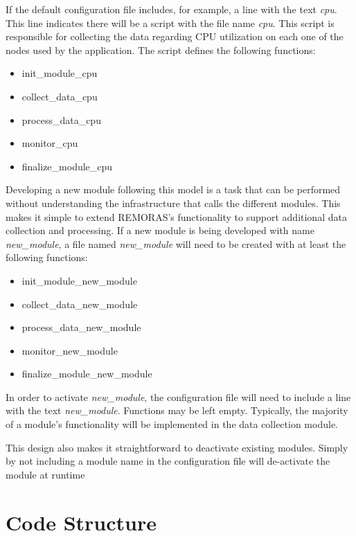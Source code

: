 \documentclass[10pt,a4paper]{report}
\begin{document}
If the default configuration file includes, for example, a line with the text \textit{cpu}.
This line indicates there will be a script with the file name \textit{cpu}. This script
is responsible for collecting the data regarding CPU utilization on each one of the
nodes used by the application. The script defines the following functions:

\begin{itemize}
	\item init\_module\_cpu
	\item collect\_data\_cpu
	\item process\_data\_cpu
	\item monitor\_cpu
	\item finalize\_module\_cpu
\end{itemize}

Developing a new module following this model is a task that can be performed without understanding 
the infrastructure that calls the different modules.
This makes it simple to extend REMORAS's functionality to
support additional data collection and processing. If a new module is being developed with 
name \textit{new\_module}, a file named \textit{new\_module} will need to be created with at 
least the following functions:

\begin{itemize}
	\item init\_module\_new\_module
	\item collect\_data\_new\_module
	\item process\_data\_new\_module
	\item monitor\_new\_module
	\item finalize\_module\_new\_module
\end{itemize}

In order to activate \emph{new\_module}, the configuration file will need to include a line
with the text \textit{new\_module}. Functions may be left empty. Typically, the majority of 
a module's functionality will be implemented in the data collection module.

This design also makes it straightforward to deactivate existing modules.
Simply by not including a module name in the configuration file will de-activate the module at runtime

\FloatBarrier
\section{Code Structure}
\end{document}

